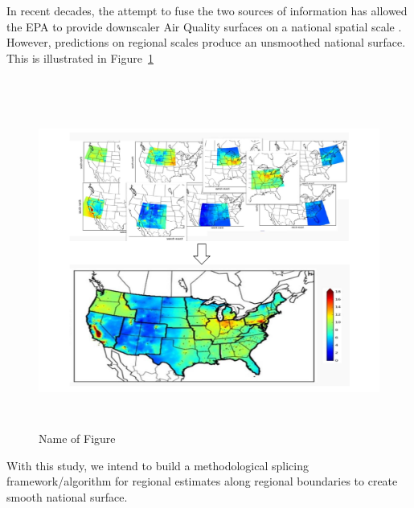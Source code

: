 \documentclass[10pt]{article}
\theoremstyle{plain}
\theoremstyle{definition}
\theoremstyle{remark}
\begin{document}
\justify
In recent decades, the attempt to fuse the two sources of information has allowed the EPA to provide downscaler Air Quality surfaces on a national spatial scale \cite{berrocal2010bivariate, berrocal2010spatio}.  However, predictions on regional scales produce an unsmoothed national surface.  This is illustrated in Figure~\ref{fig:Regional overlapping}\\~
\begin{figure}[!ht]
	\centering
	\vspace{-5em}
	\includegraphics[width= 16cm, scale = 1, height = 11cm]{Image_1}
	\caption{Name of Figure}
	\label{fig:Regional overlapping}
\end{figure}

\justify
With this study, we intend to build a methodological splicing framework/algorithm for regional estimates along regional boundaries to create smooth national surface.

\end{document}
